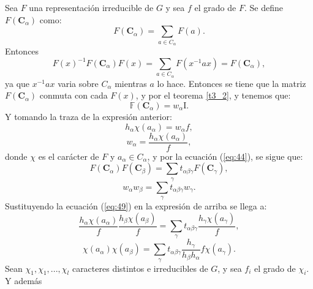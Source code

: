 \documentclass[12pt]{book}
\theoremstyle{definition}
\newcounter{in}
\begin{document}
Sea $F$ una representación irreducible
de $G$ y sea $f$ el grado de $F$. Se define
$F (\boldsymbol{C}_{\alpha})$ como:
\begin{equation}
  \label{eq:45}
  F (\boldsymbol{C}_{\alpha}) = \sum_{a \in C_{\alpha}} F(a).
\end{equation}
Entonces
\begin{equation}
  \label{eq:47}
  F(x)^{-1}F(\boldsymbol{C}_{\alpha})F(x)=\sum_{a \in C_{\alpha}}F(x^{-1}ax)=F(\boldsymbol{C}_{\alpha}),
\end{equation}
ya que $x^{-1}ax$ varia sobre $C_{\alpha}$ mientras $a$ lo
hace. Entonces se tiene que la matriz $F (\boldsymbol{C}_{\alpha})$ conmuta con cada $F(x)$, y
por el teorema \ref{t3_2}, y tenemos que:
\begin{equation}
  \label{eq:48}
   \mathbb{F} (\boldsymbol{C}_{\alpha})=w_{\alpha}\mathrm{I}.
\end{equation}
Y tomando la traza de la expresión anterior:
\begin{equation}
  \label{eq:49}
  h_{\alpha}\chi(a_{\alpha})=w_{\alpha}f,
\end{equation}
\begin{equation}
  \label{eq:50}
  w_{\alpha}=\frac{h_{\alpha}\chi(a_{\alpha})}{f},
\end{equation}
donde $\chi$ es el carácter de $F$ y
$a_{\alpha} \in C_{\alpha}$, y por la ecuación (\ref{eq:44}), se sigue que:
\begin{equation}
  \label{eq:51}
  F (\boldsymbol{C}_{\alpha})  F (\boldsymbol{C}_{\beta}) = \sum_{\gamma} t_{\alpha \beta \gamma} F(\boldsymbol{C}_{\gamma}),
\end{equation}
\begin{equation}
  \label{eq:52}
  w_{\alpha}w_{\beta} = \sum_{\gamma} t_{\alpha \beta \gamma} w_{\gamma}.
\end{equation}
Sustituyendo la ecuación (\ref{eq:49}) en la expresión de arriba se llega a:
\begin{equation*}
  \frac{h_{\alpha} \chi(a_{\alpha})}{f} \frac{h_{\beta} \chi(a_{\beta})}{f} = \sum_{\gamma} t_{\alpha \beta \gamma} \frac{h_{\gamma} \chi(a_{\gamma})}{f},
\end{equation*}
\begin{equation}
  \label{eq:53}
   \chi(a_{\alpha}) \chi(a_{\beta}) = \sum_{\gamma} t_{\alpha \beta \gamma} \frac{h_{\gamma}}{h_{\beta} h_{\alpha}} f \chi(a_{\gamma}).
\end{equation}
Sean $\chi_{1}, \chi_{1},..., \chi_{l}$ caracteres distintos e
irreducibles de $G$, y sea $f_{i}$ el grado de $\chi_{i}$. Y además
\end{document}
